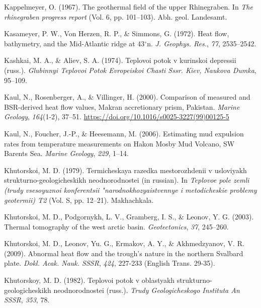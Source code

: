 \begin{CSLReferences}{1}{1}
\leavevmode{}%
Kappelmeyer, O. (1967). The geothermal field of the upper {Rhinegraben}. In \emph{The rhinegraben progress report} (Vol. 6, pp. 101--103). Abh. geol. Landesamt.

\leavevmode{}%
Kasameyer, P. W., Von Herzen, R. P., \& Simmons, G. (1972). Heat flow, bathymetry, and the {Mid-Atlantic} ridge at 43\(^\circ\)n. \emph{J. Geophys. Res.}, \emph{77}, 2535--2542.

\leavevmode{}%
Kashkai, M. A., \& Aliev, S. A. (1974). Teplovoi potok v kurinskoi depressii (russ.). \emph{Glubinnyi Teplovoi Potok Evropeiskoi Chasti Sssr. Kiev, Naukova Dumka}, 95--109.

\leavevmode{}%
Kaul, N., Rosenberger, A., \& Villinger, H. (2000). Comparison of measured and {BSR-derived} heat flow values, {Makran} accretionary prism, {Pakistan}. \emph{Marine Geology}, \emph{164}(1-2), 37--51. \url{https://doi.org/10.1016/s0025-3227(99)00125-5}

\leavevmode{}%
Kaul, N., Foucher, J.-P., \& Heesemann, M. (2006). Estimating mud expulsion rates from temperature measurements on {Hakon Mosby Mud Volcano, SW Barents Sea}. \emph{Marine Geology}, \emph{229}, 1--14.

\leavevmode{}%
Khutorskoi, M. D. (1979). Termicheskaya razedka mestorozhdenii v usloviyakh strukturno-geologicheskikh neodnorodnostei (in russian). In \emph{Teplovoe pole zemli (trudy vsesoyuznoi konferentsii "narodnokhozyaistvennye i metodicheskie problemy geotermii) T2} (Vol. S, pp. 12--21). Makhachkala.

\leavevmode{}%
Khutorskoi, M. D., Podgornykh, L. V., Gramberg, I. S., \& Leonov, Y. G. (2003). Thermal tomography of the west arctic basin. \emph{Geotectonics}, \emph{37}, 245--260.

\leavevmode{}%
Khutorskoi, M. D., Leonov, Yu. G., Ermakov, A. Y., \& Akhmedzyanov, V. R. (2009). Abnormal heat flow and the trough's nature in the northern {Svalbard} plate. \emph{Dokl. Acak. Nauk. SSSR}, \emph{424}, 227-233 (English Trans. 29-35).

\leavevmode{}%
Khutorskoy, M. D. (1982). Teplovoi potok v oblastyakh strukturno-geologicheskikh neodnorodnostei (russ.). \emph{Trudy Geologicheskogo Instituta An SSSR}, \emph{353}, 78.


\end{CSLReferences}
